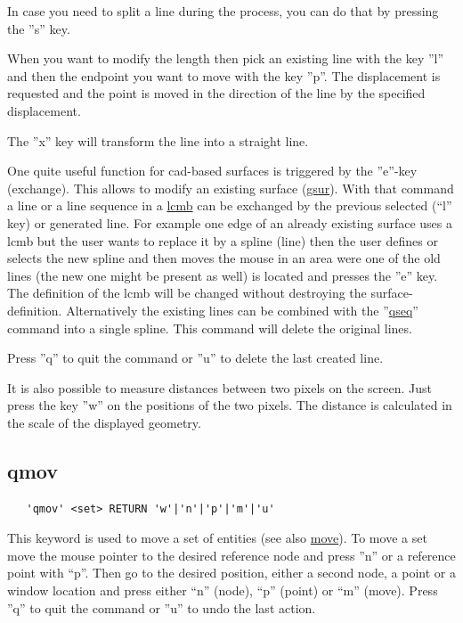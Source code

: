 \documentclass{article}
\providecommand{\htmlref}[2]{\hyperref[#2]{#1}}
\begin{document}
In case you need to split a line during the process, you can do that by pressing the ''s'' key.

When you want to modify the length then pick an existing line with the key ''l'' and then the endpoint you want to move with the key ''p''. The displacement is requested and the point is moved in the direction of the line by the specified displacement. 

The ''x'' key will transform the line into a straight line.

One quite useful function for cad-based surfaces is triggered by the ''e''-key (exchange). This allows to modify an existing surface (\htmlref{gsur}{gsur}). With that command a line or a line sequence in a \htmlref{lcmb}{lcmb} can be exchanged by the previous selected (``l'' key) or generated line. For example one edge of an already existing surface uses a lcmb but the user wants to replace it by a spline (line) then the user defines or selects the new spline and then moves the mouse in an area were one of the old lines (the new one might be present as well) is located and presses the ''e'' key. The definition of the lcmb will be changed without destroying the surface-definition. Alternatively the existing lines can be combined with the ''\htmlref{qseq}{qseq}'' command into a single spline. This command will delete the original lines.

Press ''q'' to quit the command or ''u'' to delete the last created line.



It is also possible to measure distances between two pixels on the screen. Just press the key ''w'' on the positions of the two pixels. The distance is calculated in the scale of the displayed geometry.


\subsection{\label{qmov}qmov}
\begin{verbatim}
   'qmov' <set> RETURN 'w'|'n'|'p'|'m'|'u'
\end{verbatim}
This keyword is used to move a set of entities (see also \htmlref{move}{move}). To move a set move the mouse pointer to the desired reference node and press ''n'' or a reference point with ``p''. Then go to the desired position, either a second node, a point or a window location and press either ``n'' (node), ``p'' (point) or ``m'' (move). Press ''q'' to quit the command or ''u'' to undo the last action. 
\end{document}
